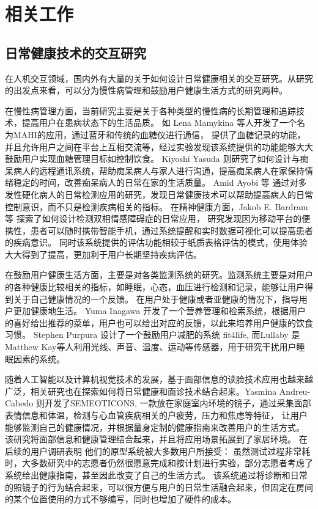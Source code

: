\chapter{相关工作}

\section{日常健康技术的交互研究}

在人机交互领域，国内外有大量的关于如何设计日常健康相关的交互研究。从研究的出发点来看，可以分为慢性病管理和鼓励用户健康生活方式的研究两种。

在慢性病管理方面，当前研究主要是关于各种类型的慢性病的长期管理和追踪技术，提高用户在患病状态下的生活品质。
如 Lena Mamykina \cite{mamykina2008mahi:}等人开发了一个名为MAHI的应用，通过蓝牙和传统的血糖仪进行通信，
提供了血糖记录的功能，并且允许用户之间在平台上互相交流等，经过实验发现该系统提供的功能能够大大鼓励用户实现血糖管理目标如控制饮食。
Kiyoshi Yasuda \cite{yasuda2009remote}则研究了如何设计与痴呆病人的远程通讯系统，帮助痴呆病人与家人进行沟通，提高痴呆病人在家保持情绪稳定的时间，改善痴呆病人的日常在家的生活质量。
Amid Ayobi 等\cite{ayobi2017quantifying} 通过对多发性硬化病人的日常检测应用的研究，发现日常健康技术可以帮助提高病人的日常控制意识，而不只是检测疾病相关的指标。
在精神健康方面，Jakob E. Bardram等 \cite{bardram2013designing}探索了如何设计检测双相情感障碍症的日常应用， 研究发现因为移动平台的便携性，患者可以随时携带智能手机，通过系统提醒和实时数据可视化可以提高患者的疾病意识。
同时该系统提供的评估功能相较于纸质表格评估的模式，使用体验大大得到了提高，更加利于用户长期坚持疾病评估。

在鼓励用户健康生活方面，主要是对各类监测系统的研究。监测系统主要是对用户的各种健康比较相关的指标，如睡眠，心态，血压进行检测和记录，能够让用户得到关于自己健康情况的一个反馈。
在用户处于健康或者亚健康的情况下，指导用户更加健康地生活。 
Yuma Inagawa  \cite{Inagawa2013A} 开发了一个营养管理和检索系统，根据用户的喜好给出推荐的菜单，用户也可以给出对应的反馈，以此来培养用户健康的饮食习惯。
Stephen Purpura \cite{purpura2011fit4life} 设计了一个鼓励用户减肥的系统 fit4life,  而Lullaby  \cite{kay2012lullaby} 是Matthew Kay等人利用光线、声音、温度、运动等传感器，用于研究干扰用户睡眠因素的系统。

随着人工智能以及计算机视觉技术的发展，基于面部信息的读脸技术应用也越来越广泛，相关研究也在探索如何将日常健康和面诊技术结合起来。Yasmina Andreu-Cabedo  \cite{andreu2015mirror}则开发了SEMEOTICONS, 一款放在家庭室内环境的镜子，通过采集面部表情信息和体温，检测与心血管疾病相关的户疲劳，压力和焦虑等特征， 让用户能够监测自己的健康情况，并根据量身定制的健康指南来改善用户的生活方式。
 该研究将面部信息和健康管理结合起来，并且将应用场景拓展到了家居环境。
 在后续的用户调研表明\cite{coppini2017user} 他们的原型系统被大多数用户所接受： 虽然测试过程非常耗时，大多数研究中的志愿者仍然很愿意完成和按计划进行实验，部分志愿者考虑了系统给出健康指南，甚至因此改变了自己的生活方式。
该系统通过将诊断和日常的照镜子的行为结合起来，可以很方便与用户的日常生活融合起来，但固定在房间的某个位置使用的方式不够编写，同时也增加了硬件的成本。

